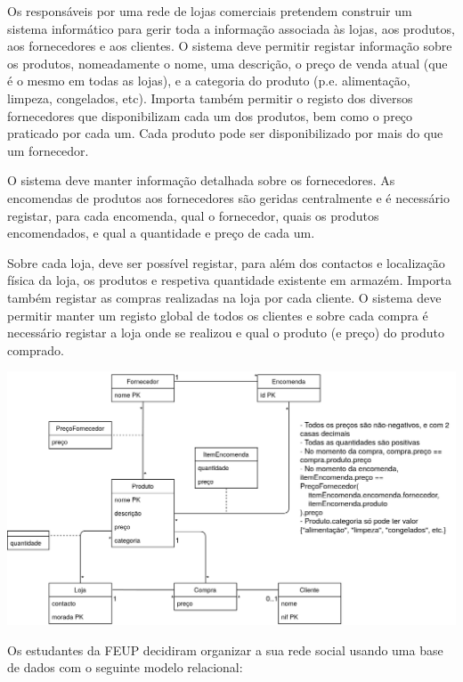 \documentclass[type=normal, year=2015/16]{bdad_exam}
\begin{document}
{Os responsáveis por uma rede de lojas comerciais pretendem construir um sistema informático para gerir toda a informação associada às lojas, aos produtos, aos fornecedores e aos clientes. O sistema deve permitir registar informação sobre os produtos, nomeadamente o nome, uma descrição, o preço de venda atual (que é o mesmo em todas as lojas), e a categoria do produto (p.e. alimentação, limpeza, congelados, etc). Importa também permitir o registo dos diversos fornecedores que disponibilizam cada um dos produtos, bem como o preço praticado por cada um. Cada produto pode ser disponibilizado por mais do que um fornecedor.

O sistema deve manter informação detalhada sobre os fornecedores. As encomendas de produtos aos fornecedores são geridas centralmente e é necessário registar, para cada encomenda, qual o fornecedor, quais os produtos encomendados, e qual a quantidade e preço de cada um.

Sobre cada loja, deve ser possível registar, para além dos contactos e localização física da loja, os produtos e respetiva quantidade existente em armazém. Importa também registar as compras realizadas na loja por cada cliente. O sistema deve permitir manter um registo global de todos os clientes e sobre cada compra é necessário registar a loja onde se realizou e qual o produto (e preço) do produto comprado.

\ansseparator

\begin{center}
    \includegraphics[scale=0.263]{2016N_13.png}
\end{center}

\newpage
{}

Os estudantes da FEUP decidiram organizar a sua rede social usando uma base de dados com o seguinte modelo relacional:

}
\end{document}
